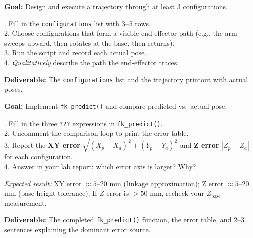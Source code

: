 \documentclass[11pt,a4paper]{article}
\begin{document}
\vspace{6pt}

\begin{tcolorbox}[infobox, title={Task 2 — Multi-Step Trajectory (15 min)}]
  \textbf{Goal:} Design and execute a trajectory through at least 3 configurations.

  . Fill in the \texttt{configurations} list with 3--5 rows. \\
  2. Choose configurations that form a visible end-effector path
     (e.g., the arm sweeps upward, then rotates at the base, then returns). \\
  3. Run the script and record each actual pose. \\
  4. \emph{Qualitatively} describe the path the end-effector traces.

  \smallskip
  \textbf{Deliverable:} The \texttt{configurations} list and the trajectory printout with actual poses.
\end{tcolorbox}

\vspace{6pt}

\begin{tcolorbox}[infobox, title={Task 3 — FK Verification (20 min)}]
  \textbf{Goal:} Implement \texttt{fk\_predict()} and compare predicted vs.\ actual pose.

  . Fill in the three \texttt{???} expressions in \texttt{fk\_predict()}. \\
  2. Uncomment the comparison loop to print the error table. \\
  3. Report the \textbf{XY error} $\sqrt{(X_p - X_a)^2 + (Y_p - Y_a)^2}$ and
     \textbf{Z error} $|Z_p - Z_a|$ for each configuration. \\
  4. Answer in your lab report: which error axis is larger? Why?

  \smallskip
  \textit{Expected result:} XY error $\approx 5$--$20$ mm (linkage approximation);
  Z error $\approx 5$--$20$ mm (base height tolerance).
  If $Z$ error is $>50$ mm, recheck your $Z_{\text{base}}$ measurement.

  \smallskip
  \textbf{Deliverable:} The completed \texttt{fk\_predict()} function, the error table,
  and 2--3 sentences explaining the dominant error source.
\end{tcolorbox}

\vspace{6pt}
\end{document}
